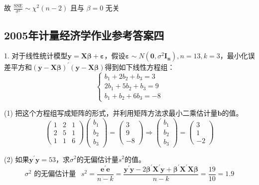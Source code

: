 	故 $ \frac{\text{SSE}}{\sigma^{2}} \sim \chi^{2}(n-2) $   且与  $ \beta=0 $  无关 
\subsection{2005年计量经济学作业参考答案四}	
  1. 对于线性统计模型$ \boldsymbol{y} = \boldsymbol{X\beta}+\boldsymbol{\varepsilon} $，假设$ \boldsymbol{\varepsilon}\sim N\left(\boldsymbol{0}, \sigma^{2} \boldsymbol{I_{n}}\right), n=13, k=3 $，最小化误差平方和$ (\boldsymbol{y}-\boldsymbol{X \beta})^{\prime}(\boldsymbol{y}-\boldsymbol{X \beta}) $得到如下线性方程组：
\begin{equation}
	\left\{\begin{aligned}
		b_{1}+2 b_{2}+b_{3}=3 \\
		2 b_{1}+5 b_{2}+b_{3}=9 \\
		b_{1}+b_{2}+6 b_{3}=-8 \nonumber
	\end{aligned}\right.
\end{equation}

 (1) 把这个方程组写成矩阵的形式，并利用矩阵方法求最小二乘估计量$ \boldsymbol{b} $的值。
 $$ \left(\begin{array}{lll}
	1 & 2 & 1 \\
	2 & 5 & 1 \\
	1 & 1 & 6
\end{array}\right)\left(\begin{array}{l}
	b_{1} \\
	b_{2} \\
	b_{3}
\end{array}\right)=\left(\begin{array}{c}
	3 \\
	9 \\
	-8
\end{array}\right) \Rightarrow\left(\begin{array}{l}
	b_{1} \\
	b_{2} \\
	b_{3}
\end{array}\right)=\left(\begin{array}{c}
	3 \\
	1 \\
	-2
\end{array}\right) $$

 (2) 如果$ \boldsymbol{y}^{\prime} \boldsymbol{y}=53 $，求$ \sigma^{2} $的无偏估计量$ s^{2} $的值。
$$  \sigma^{2} \text{ 的无偏估计量 } ~  ~
 s^{2}= \frac{\boldsymbol{e}^{\prime} \boldsymbol{e}}{n-k}=\frac{\boldsymbol{y}^{\prime} 
  \boldsymbol{y}-2 \boldsymbol{\beta}^{\prime} \boldsymbol{X}^{\prime} \boldsymbol{y}+\boldsymbol{\beta}^{\prime} 
  \boldsymbol{X}^{\prime} \boldsymbol{X} \boldsymbol{\beta}}{n-k} = \frac{19}{10}=1.9  $$

